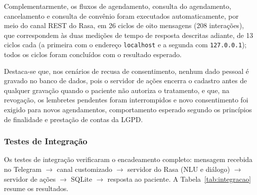 \documentclass[12pt,a4paper]{extarticle}
\begin{document}
Complementarmente, os fluxos de agendamento, consulta do agendamento, cancelamento e consulta de convênio foram executados automaticamente, por meio do canal REST do Rasa, em 26 ciclos de oito mensagens (208 interações), que correspondem às duas medições de tempo de resposta descritas adiante, de 13 ciclos cada (a primeira com o endereço \texttt{localhost} e a segunda com \texttt{127.0.0.1}); todos os ciclos foram concluídos com o resultado esperado.

Destaca-se que, nos cenários de recusa de consentimento, nenhum dado pessoal é gravado no banco de dados, pois o servidor de ações encerra o cadastro antes de qualquer gravação quando o paciente não autoriza o tratamento, e que, na revogação, os lembretes pendentes foram interrompidos e novo consentimento foi exigido para novos agendamentos, comportamento esperado segundo os princípios de finalidade e prestação de contas da LGPD.

\subsubsection{Testes de Integração}
\label{sec:res_integracao}

Os testes de integração verificaram o encadeamento completo: mensagem recebida no Telegram $\rightarrow$ canal customizado $\rightarrow$ servidor do Rasa (NLU e diálogo) $\rightarrow$ servidor de ações $\rightarrow$ SQLite $\rightarrow$ resposta ao paciente. A Tabela~\ref{tab:integracao} resume os resultados.
\end{document}
